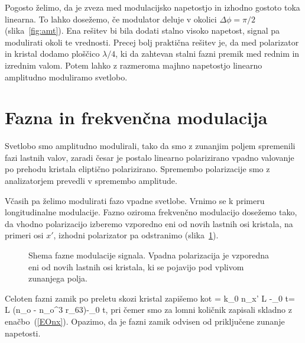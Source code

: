 Pogosto želimo, da je zveza med modulacijsko napetostjo in izhodno
gostoto toka linearna. To lahko dosežemo, če modulator deluje v okolici $\Delta\phi=\pi/2$
(slika~\ref{fig:amt}).
Ena rešitev bi bila dodati stalno visoko napetost, signal pa modulirati okoli
te vrednosti. Precej bolj praktična rešitev je, da med polarizator
in kristal dodamo ploščico $\lambda/4$, ki da zahtevan stalni
fazni premik med rednim in izrednim valom. Potem lahko z razmeroma majhno napetostjo
linearno amplitudno moduliramo svetlobo.

\section{Fazna in frekvenčna modulacija}
Svetlobo smo amplitudno modulirali, tako da smo z zunanjim
poljem spremenili fazi lastnih valov, zaradi česar je postalo linearno
polarizirano vpadno valovanje po prehodu kristala eliptično polarizirano.
Spremembo polarizacije smo z analizatorjem prevedli v spremembo amplitude.

Včasih pa želimo modulirati fazo vpadne svetlobe. Vrnimo se k primeru longitudinalne
 modulacije. Fazno oziroma frekvenčno modulacijo dosežemo tako,
da vhodno polarizacijo izberemo vzporedno eni od novih lastnih osi kristala, 
na primeri osi $x'$, izhodni polarizator pa odstranimo (slika~\ref{fig:fmshema}). 
\begin{figure}[h]
\centering
\def\svgwidth{80truemm} 

\caption{Shema fazne modulacije signala. Vpadna polarizacija je vzporedna eni od 
novih lastnih osi kristala, ki se pojavijo pod vplivom zunanjega polja.}
\label{fig:fmshema}
\end{figure}

Celoten fazni zamik po preletu skozi kristal zapišemo kot 
\beq
\phi =  k_0 n_{x'} L -\omega_0 t= L \left(n_o -
n_o^3 r_{63}\right)-\omega_0 t,
\label{fmphi}
\eeq
pri čemer smo za lomni količnik zapisali skladno z enačbo~(\ref{EOnx}). Opazimo,
da je fazni zamik odvisen od priključene zunanje napetosti.

